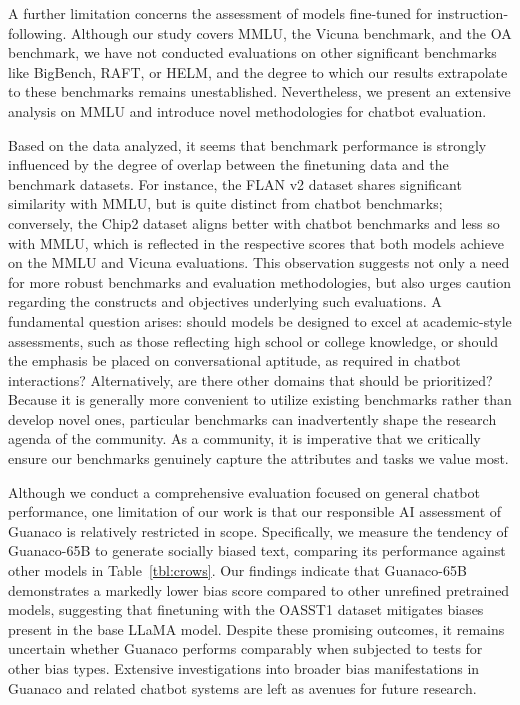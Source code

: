 A further limitation concerns the assessment of models fine-tuned for instruction-following. Although our study covers MMLU, the Vicuna benchmark, and the OA benchmark, we have not conducted evaluations on other significant benchmarks like BigBench, RAFT, or HELM, and the degree to which our results extrapolate to these benchmarks remains unestablished. Nevertheless, we present an extensive analysis on MMLU and introduce novel methodologies for chatbot evaluation.

Based on the data analyzed, it seems that benchmark performance is strongly influenced by the degree of overlap between the finetuning data and the benchmark datasets. For instance, the FLAN v2 dataset shares significant similarity with MMLU, but is quite distinct from chatbot benchmarks; conversely, the Chip2 dataset aligns better with chatbot benchmarks and less so with MMLU, which is reflected in the respective scores that both models achieve on the MMLU and Vicuna evaluations. This observation suggests not only a need for more robust benchmarks and evaluation methodologies, but also urges caution regarding the constructs and objectives underlying such evaluations. A fundamental question arises: should models be designed to excel at academic-style assessments, such as those reflecting high school or college knowledge, or should the emphasis be placed on conversational aptitude, as required in chatbot interactions? Alternatively, are there other domains that should be prioritized? Because it is generally more convenient to utilize existing benchmarks rather than develop novel ones, particular benchmarks can inadvertently shape the research agenda of the community. As a community, it is imperative that we critically ensure our benchmarks genuinely capture the attributes and tasks we value most.

Although we conduct a comprehensive evaluation focused on general chatbot performance, one limitation of our work is that our responsible AI assessment of {Guanaco} is relatively restricted in scope. Specifically, we measure the tendency of {Guanaco}-65B to generate socially biased text, comparing its performance against other models in Table~\ref{tbl:crows}. Our findings indicate that {Guanaco}-65B demonstrates a markedly lower bias score compared to other unrefined pretrained models, suggesting that finetuning with the OASST1 dataset mitigates biases present in the base LLaMA model. Despite these promising outcomes, it remains uncertain whether {Guanaco} performs comparably when subjected to tests for other bias types. Extensive investigations into broader bias manifestations in {Guanaco} and related chatbot systems are left as avenues for future research.

